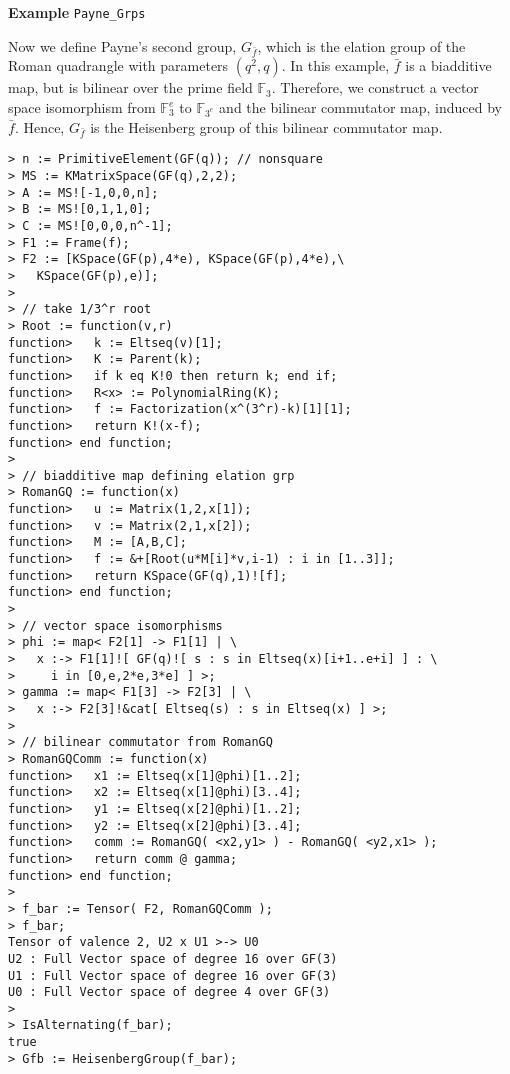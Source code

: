 \begin{framed} {\bf Example} {\tt Payne\_Grps}
{Now we define Payne's second group, $G_{\bar{f}}$, which is the elation group of the Roman quadrangle with parameters $(q^2,q)$.
In this example, $\bar{f}$ is a biadditive map, but is bilinear over the prime field $\mathbb{F}_3$.
Therefore, we construct a vector space isomorphism from $\mathbb{F}_3^e$ to $\mathbb{F}_{3^e}$ and the bilinear commutator map, induced by $\bar{f}$. 
Hence, $G_{\bar{f}}$ is the Heisenberg group of this bilinear commutator map.
\begin{lstlisting}[frame=single,basicstyle=\ttfamily\color{black!30!
teal},backgroundcolor=\color{white!70!gray}]
> n := PrimitiveElement(GF(q)); // nonsquare
> MS := KMatrixSpace(GF(q),2,2);
> A := MS![-1,0,0,n];
> B := MS![0,1,1,0];
> C := MS![0,0,0,n^-1];
> F1 := Frame(f);
> F2 := [KSpace(GF(p),4*e), KSpace(GF(p),4*e),\
>   KSpace(GF(p),e)];
> 
> // take 1/3^r root
> Root := function(v,r) 
function>   k := Eltseq(v)[1];
function>   K := Parent(k);
function>   if k eq K!0 then return k; end if;
function>   R<x> := PolynomialRing(K);
function>   f := Factorization(x^(3^r)-k)[1][1];
function>   return K!(x-f);
function> end function;
> 
> // biadditive map defining elation grp
> RomanGQ := function(x) 
function>   u := Matrix(1,2,x[1]);
function>   v := Matrix(2,1,x[2]);
function>   M := [A,B,C];
function>   f := &+[Root(u*M[i]*v,i-1) : i in [1..3]];
function>   return KSpace(GF(q),1)![f];
function> end function;
> 
> // vector space isomorphisms
> phi := map< F2[1] -> F1[1] | \
>   x :-> F1[1]![ GF(q)![ s : s in Eltseq(x)[i+1..e+i] ] : \
>     i in [0,e,2*e,3*e] ] >;
> gamma := map< F1[3] -> F2[3] | \
>   x :-> F2[3]!&cat[ Eltseq(s) : s in Eltseq(x) ] >;
> 
> // bilinear commutator from RomanGQ
> RomanGQComm := function(x)
function>   x1 := Eltseq(x[1]@phi)[1..2];
function>   x2 := Eltseq(x[1]@phi)[3..4];
function>   y1 := Eltseq(x[2]@phi)[1..2];
function>   y2 := Eltseq(x[2]@phi)[3..4];
function>   comm := RomanGQ( <x2,y1> ) - RomanGQ( <y2,x1> );
function>   return comm @ gamma;
function> end function;
> 
> f_bar := Tensor( F2, RomanGQComm );
> f_bar;
Tensor of valence 2, U2 x U1 >-> U0
U2 : Full Vector space of degree 16 over GF(3)
U1 : Full Vector space of degree 16 over GF(3)
U0 : Full Vector space of degree 4 over GF(3)
> 
> IsAlternating(f_bar);
true
> Gfb := HeisenbergGroup(f_bar);
\end{lstlisting}

}
\end{framed}
